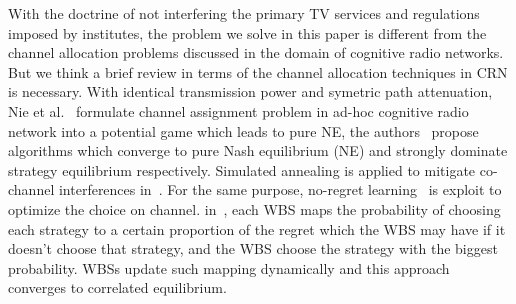 \documentclass[times]{ettauth}
\theoremstyle{mytheoremstyle}
\theoremstyle{mytheoremstyle}
\theoremstyle{mytheoremstyle}
\begin{document}
With the doctrine of not interfering the primary TV services and regulations imposed by institutes, the problem we solve in this paper is different from the channel allocation problems discussed in the domain of cognitive radio networks.
But we think a brief review in terms of the channel allocation techniques in CRN is necessary.
%
With identical transmission power and symetric path attenuation, Nie et al.~\cite{CApotentialLearning_05dyspan} formulate channel assignment problem in ad-hoc cognitive radio network into a potential game which leads to pure NE, the authors~\cite{CA_Felegyhazi_07infocom, Wu_GOP_CA_08infocom} propose algorithms which converge to pure Nash equilibrium (NE) and strongly dominate strategy equilibrium respectively. 
Simulated annealing is applied to mitigate co-channel interferences in~\cite{SA_CA_TVWS_2012crowncom}.
For the same purpose, no-regret learning~\cite{qlearning_huang, hart00correlatedeq} is exploit to optimize the choice on channel.
in~\cite{hart00correlatedeq}, each WBS maps the probability of choosing each strategy to a certain proportion of the regret which the WBS may have if it doesn't choose that strategy, and the WBS choose the strategy with the biggest probability.  
WBSs update such mapping dynamically and this approach converges to correlated equilibrium. 


\end{document}
